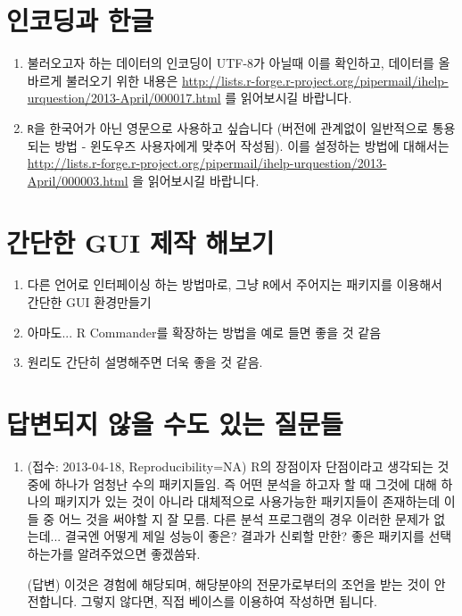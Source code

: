 \documentclass{article}
\begin{document}
\section{인코딩과 한글}
\begin{enumerate}
\item 불러오고자 하는 데이터의 인코딩이 UTF-8가 아닐때 이를 확인하고, 데이터를 올바르게 불러오기 위한 내용은 \url{http://lists.r-forge.r-project.org/pipermail/ihelp-urquestion/2013-April/000017.html} 를 읽어보시길 바랍니다.

\item \texttt{R}을 한국어가 아닌 영문으로 사용하고 싶습니다 (버전에 관계없이 일반적으로 통용되는 방법 - 윈도우즈 사용자에게 맞추어 작성됨).
이를 설정하는 방법에 대해서는 \url{http://lists.r-forge.r-project.org/pipermail/ihelp-urquestion/2013-April/000003.html} 을 읽어보시길 바랍니다.
\end{enumerate}


%
%
%

\section{간단한 GUI 제작 해보기}

\begin{enumerate}
	\item 다른 언어로 인터페이싱 하는 방법마로, 그냥 \texttt{R}에서 주어지는 패키지를 이용해서 간단한 GUI 환경만들기
	\item 아마도... R Commander를 확장하는 방법을 예로 들면 좋을 것 같음
	\item 원리도 간단히 설명해주면 더욱 좋을 것 같음. 
\end{enumerate}


%
%
%


\section{답변되지 않을 수도 있는 질문들}

\begin{enumerate}
	\item (접수: 2013-04-18, Reproducibility=NA) R의 장점이자 단점이라고 생각되는 것 중에 하나가 엄청난 수의 패키지들임. 즉 어떤 분석을 하고자 할 때 그것에 대해 하나의 패키지가 있는 것이 아니라 대체적으로 사용가능한 패키지들이 존재하는데 이들 중 어느 것을 써야할 지 잘 모름. 다른 분석 프로그램의 경우 이러한 문제가 없는데... 결국엔 어떻게 제일 성능이 좋은? 결과가 신뢰할 만한? 좋은 패키지를 선택하는가를 알려주었으면 좋겠씀돠.
	
	\textsf{(답변)} 이것은 경험에 해당되며, 해당분야의 전문가로부터의 조언을 받는 것이 안전합니다.  그렇지 않다면, 직접 베이스를 이용하여 작성하면 됩니다. 
	
\end{enumerate}
\end{document}
